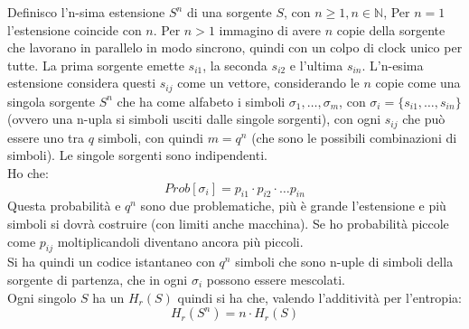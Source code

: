 \documentclass[a4paper,12pt, oneside]{book}
\begin{document}
\begin{definizione}
  Definisco l'n-sima estensione $S^n$ di una sorgente $S$, con $n\geq 1, n\in
  \mathbb{N}$, Per $n=1$ l'estensione coincide con $n$. Per $n>1$ immagino di
  avere $n$ copie della sorgente che lavorano in parallelo in modo sincrono,
  quindi con un colpo di clock unico per tutte. La prima sorgente emette
  $s_{i1}$, la seconda $s_{i2}$ e l'ultima $s_{in}$. L'n-esima
  estensione 
  considera questi $s_{ij}$ come un vettore, considerando le $n$ copie come una
  singola sorgente $S^n$ che ha come alfabeto i simboli $\sigma_1,
  \ldots,\sigma_m$, con $\sigma_i=\{s_{i1},\ldots, s_{in}\}$ (ovvero una n-upla
  si simboli usciti dalle singole sorgenti), con ogni $s_{ij}$ che può essere
  uno tra $q$ simboli, con quindi
  $m=q^n$ (che sono le possibili combinazioni di simboli). Le 
  singole sorgenti sono indipendenti.\\ 
  Ho che:
  \[Prob[\sigma_i]=p_{i1}\cdot p_{i2}\cdot \ldots p_{in}\]
  Questa probabilità e $q^n$ sono due problematiche, più è grande l'estensione e
  più simboli si dovrà costruire (con limiti anche macchina). Se ho probabilità
  piccole come $p_{ij}$ moltiplicandoli diventano ancora più piccoli.\\
  Si ha quindi un codice istantaneo con $q^n$ simboli che sono n-uple di simboli
  della sorgente di partenza, che in ogni $\sigma_i$ possono essere
  mescolati. \\
  Ogni singolo $S$ ha un $H_r(S)$ quindi si ha che, valendo l'additività per
  l'entropia: 
  \[H_r(S^n)=n\cdot H_r(S)\]
  
\end{definizione}
\end{document}
